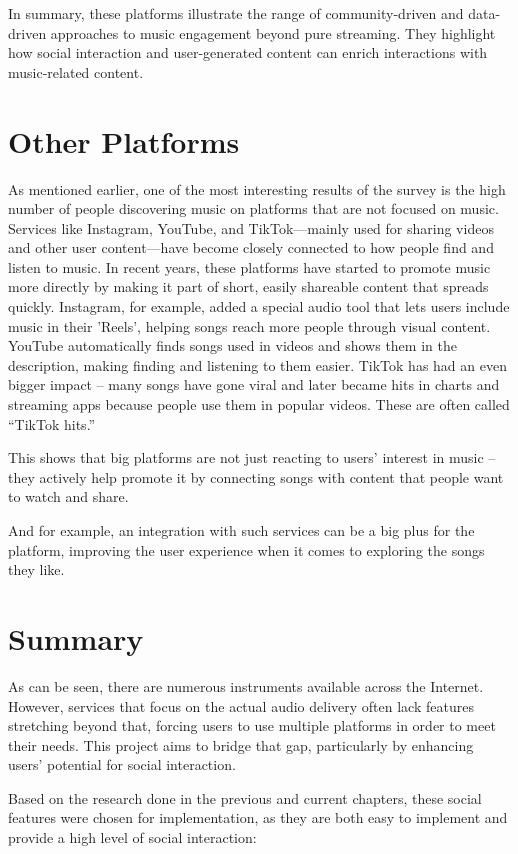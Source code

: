 In summary, these platforms illustrate the range of community-driven and data-driven approaches to music engagement
beyond pure streaming.
They highlight how social interaction and user-generated content can enrich interactions with music-related content.


\section{Other Platforms}

As mentioned earlier, one of the most interesting results of the survey is the high number of people
discovering music on platforms that are not focused on music.
Services like Instagram, YouTube, and TikTok—mainly used for sharing videos and other user content—have
become closely connected to how people find and listen to music.
In recent years, these platforms have started to promote music more directly by making it part of short,
easily shareable content that spreads quickly.
Instagram, for example, added a special audio tool that lets users include music in their 'Reels'\cite{inst_audio},
helping songs reach more people through visual content.
YouTube automatically finds songs used in videos and shows them in the description, making finding and listening to them easier.
TikTok has had an even bigger impact -- many songs have gone viral and later became hits in charts and streaming apps
because people use them in popular videos. These are often called “TikTok hits.”

This shows that big platforms are not just reacting to users’ interest in music -- they
actively help promote it by connecting songs with content that people want to watch and share.

And for example, an integration with such services can be a big plus for the platform, improving the user experience
when it comes to exploring the songs they like.

\section*{Summary}
As can be seen, there are numerous instruments available across the Internet.
However, services that focus on the actual audio delivery often lack features stretching beyond that,
forcing users to use multiple platforms in order to meet their needs. This project aims to bridge that gap,
particularly by enhancing users' potential for social interaction.

Based on the research done in the previous and current chapters, these social features were chosen for implementation,
as they are both easy to implement and provide a high level of social interaction:

